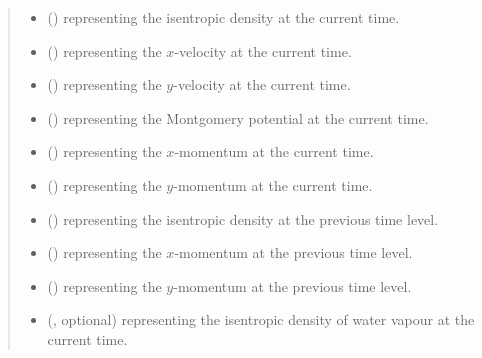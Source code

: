 \documentclass[letterpaper,10pt,english]{sphinxmanual}
\begin{document}
\begin{fulllineitems}
\begin{fulllineitems}
\begin{quote}
\begin{description}
\begin{itemize}
\item {} 
 () \textendash{}  representing the isentropic density at the current time.

\item {} 
 () \textendash{}  representing the \(x\)-velocity at the current time.

\item {} 
 () \textendash{}  representing the \(y\)-velocity at the current time.

\item {} 
 () \textendash{}  representing the Montgomery potential at the current time.

\item {} 
 () \textendash{}  representing the \(x\)-momentum at the current time.

\item {} 
 () \textendash{}  representing the \(y\)-momentum at the current time.

\item {} 
 () \textendash{}  representing the isentropic density at the previous time level.

\item {} 
 () \textendash{}  representing the \(x\)-momentum at the previous time level.

\item {} 
 () \textendash{}  representing the \(y\)-momentum at the previous time level.

\item {} 
 (, optional) \textendash{}  representing the isentropic density of water vapour at the current time.


\end{itemize}
\end{description}
\end{quote}
\end{fulllineitems}
\end{fulllineitems}
\end{document}
